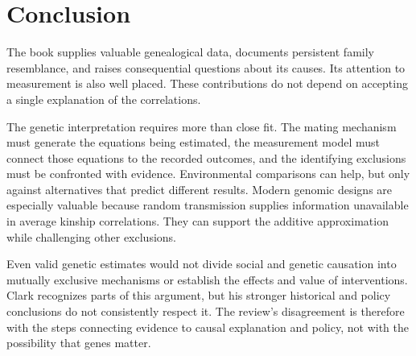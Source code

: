 \section{Conclusion}
The book supplies valuable genealogical data, documents persistent family
resemblance, and raises consequential questions about its causes. Its
attention to measurement is also well placed. These contributions do not
depend on accepting a single explanation of the correlations.

The genetic interpretation requires more than close fit. The mating
mechanism must generate the equations being estimated, the measurement
model must connect those equations to the recorded outcomes, and the
identifying exclusions must be confronted with evidence. Environmental
comparisons can help, but only against alternatives that predict different
results. Modern genomic designs are especially valuable because random
transmission supplies information unavailable in average kinship
correlations. They can support the additive approximation while challenging
other exclusions.

Even valid genetic estimates would not divide social and genetic causation
into mutually exclusive mechanisms or establish the effects and value of
interventions. Clark recognizes parts of this argument, but his stronger
historical and policy conclusions do not consistently respect it. The
review's disagreement is therefore with the steps connecting evidence to
causal explanation and policy, not with the possibility that genes matter.
